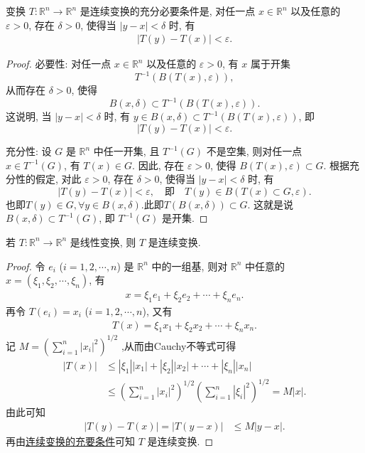 \documentclass[../../main.tex]{subfiles}
\begin{document}
\begin{theorem}[连续变换的充要条件]\label{theorem:连续变换的充要条件}
变换 $T:\mathbb{R}^n\to\mathbb{R}^n$ 是连续变换的充分必要条件是, 对任一点 $x\in\mathbb{R}^n$ 以及任意的 $\varepsilon>0$, 存在 $\delta>0$, 使得当 $|y - x|<\delta$ 时, 有
\begin{align}
|T(y) - T(x)|<\varepsilon.\label{eq:thm221}
\end{align}
\end{theorem}
\begin{proof}
{\heiti 必要性:} 对任一点 $x\in\mathbb{R}^n$ 以及任意的 $\varepsilon>0$, 有 $x$ 属于开集
\[
T^{-1}(B(T(x),\varepsilon)),
\]
从而存在 $\delta>0$, 使得
\[
B(x,\delta)\subset T^{-1}(B(T(x),\varepsilon)).
\]
这说明, 当 $|y - x|<\delta$ 时, 有 $y\in B(x,\delta)\subset T^{-1}(B(T(x),\varepsilon))$, 即
\[
|T(y) - T(x)|<\varepsilon.
\]

{\heiti 充分性:} 设 $G$ 是 $\mathbb{R}^n$ 中任一开集, 且 $T^{-1}(G)$ 不是空集, 则对任一点 $x\in T^{-1}(G)$, 有 $T(x)\in G$. 因此, 存在 $\varepsilon>0$, 使得 $B(T(x),\varepsilon)\subset G$. 根据充分性的假定, 对此 $\varepsilon>0$, 存在 $\delta>0$, 使得当 $|y - x|<\delta$ 时, 有
\[
|T(y) - T(x)|<\varepsilon,\quad \text{即}\quad T(y)\in B(T(x)\subset G,\varepsilon).
\]
也即$T(y)\in G,\forall y\in B(x,\delta)$.此即$T(B(x,\delta))\subset G$.
这就是说 $B(x,\delta)\subset T^{-1}(G)$, 即 $T^{-1}(G)$ 是开集. 

\end{proof}

\begin{proposition}
若 $T:\mathbb{R}^n\to\mathbb{R}^n$ 是线性变换, 则 $T$ 是连续变换.
\end{proposition}
\begin{proof}
令 $e_i$ ($i = 1,2,\cdots,n$) 是 $\mathbb{R}^n$ 中的一组基, 则对 $\mathbb{R}^n$ 中任意的 $x = (\xi_1,\xi_2,\cdots,\xi_n)$, 有
\begin{align*}
x = \xi_1e_1 + \xi_2e_2 + \cdots + \xi_ne_n.
\end{align*}
再令 $T(e_i) = x_i$ ($i = 1,2,\cdots,n$), 又有
\begin{align*}
T(x) = \xi_1x_1 + \xi_2x_2 + \cdots + \xi_nx_n.
\end{align*}
记 $M = \left(\sum_{i = 1}^{n}|x_i|^2\right)^{1/2}$ ,从而由Cauchy不等式可得
\begin{align*}
|T(x)|&\leqslant|\xi_1||x_1| + |\xi_2||x_2| + \cdots + |\xi_n||x_n|\\
&\leqslant\left(\sum_{i = 1}^{n}|x_i|^2\right)^{1/2}\left(\sum_{i = 1}^{n}|\xi_i|^2\right)^{1/2} = M|x|.
\end{align*}
由此可知
\begin{align*}
|T(y) - T(x)| = |T(y - x)|&\leqslant M|y - x|.
\end{align*}
再由\hyperref[theorem:连续变换的充要条件]{连续变换的充要条件}可知 $T$ 是连续变换. 

\end{proof}
\end{document}
